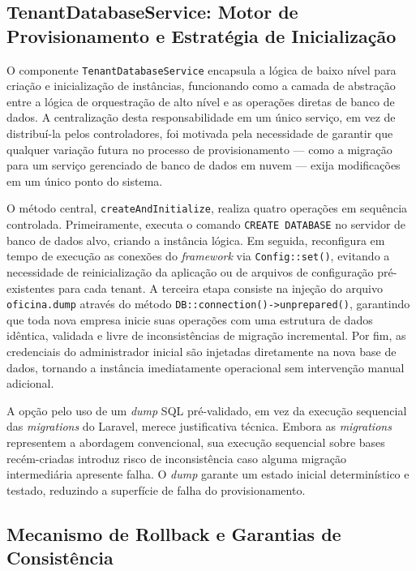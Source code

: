 \subsection{TenantDatabaseService: Motor de Provisionamento e Estratégia de Inicialização}

O componente \texttt{TenantDatabaseService} encapsula a lógica de baixo nível
para criação e inicialização de instâncias, funcionando como a camada de
abstração entre a lógica de orquestração de alto nível e as operações diretas
de banco de dados. A centralização desta responsabilidade em um único serviço,
em vez de distribuí-la pelos controladores, foi motivada pela necessidade de
garantir que qualquer variação futura no processo de provisionamento --- como
a migração para um serviço gerenciado de banco de dados em nuvem --- exija
modificações em um único ponto do sistema.

O método central, \texttt{createAndInitialize}, realiza quatro operações em
sequência controlada. Primeiramente, executa o comando \texttt{CREATE DATABASE}
no servidor de banco de dados alvo, criando a instância lógica. Em seguida,
reconfigura em tempo de execução as conexões do \textit{framework} via
\texttt{Config::set()}, evitando a necessidade de reinicialização da aplicação
ou de arquivos de configuração pré-existentes para cada tenant. A terceira etapa
consiste na injeção do arquivo \texttt{oficina.dump} através do método
\texttt{DB::connection()->unprepared()}, garantindo que toda nova empresa inicie
suas operações com uma estrutura de dados idêntica, validada e livre de
inconsistências de migração incremental. Por fim, as credenciais do
administrador inicial são injetadas diretamente na nova base de dados, tornando
a instância imediatamente operacional sem intervenção manual adicional.

A opção pelo uso de um \textit{dump} SQL pré-validado, em vez da execução
sequencial das \textit{migrations} do Laravel, merece justificativa técnica.
Embora as \textit{migrations} representem a abordagem convencional, sua execução
sequencial sobre bases recém-criadas introduz risco de inconsistência caso
alguma migração intermediária apresente falha. O \textit{dump} garante um estado
inicial determinístico e testado, reduzindo a superfície de falha do
provisionamento.

\subsection{Mecanismo de Rollback e Garantias de Consistência}

